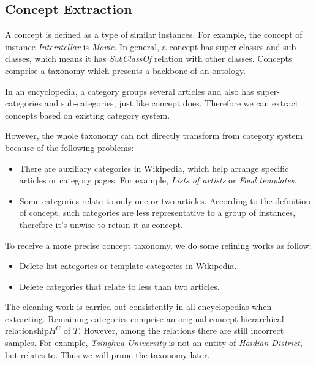 \documentclass[runningheads,a4paper]{llncs}
\begin{document}
\subsection{Concept Extraction}
\label{sec:ce}
A concept is defined as a type of similar instances. For example, the concept of instance \emph{Interstellar} is \emph{Movie}. In general, a concept has super classes and sub classes, which means it has \emph{SubClassOf} relation with other classes. Concepts comprise a taxonomy which presents a backbone of an ontology.

In an encyclopedia, a category groups several articles and also has super-categories and sub-categories, just like concept does. Therefore we can extract concepts based on existing category system.

However, the whole taxonomy can not directly transform from category system because of the following problems:
\begin{itemize}
    \item There are auxiliary categories in Wikipedia, which help arrange specific articles or category pages. For example, \emph{Lists of artists} or \emph{Food templates}.
    \item Some categories relate to only one or two articles. According to the definition of concept, such categories are less representative to a group of instances, therefore it's unwise to retain it as concept.
\end{itemize}
   To receive a more precise concept taxonomy, we do some refining works as follow:
\begin{itemize}
    \item Delete list categories or template categories in Wikipedia.
    \item Delete categories that relate to less than two articles.
\end{itemize}
The cleaning work is carried out consistently in all encyclopedias when extracting. Remaining categories comprise an original concept hierarchical relationship$H^C$ of $T$. However, among the relations there are still incorrect samples. For example, \emph{Tsinghua University} is not an entity of \emph{Haidian District}, but relates to. Thus we will prune the taxonomy later.
\end{document}

